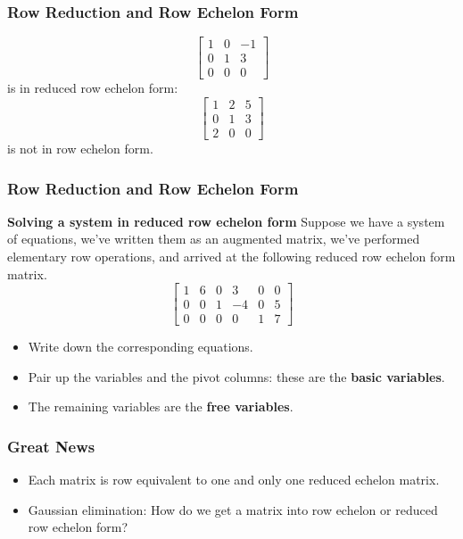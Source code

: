   \begin{frame}[fragile]\frametitle{Row Reduction and Row Echelon Form}
\[
\begin{bmatrix}
 1 & 0 & -1 \\
 0 & 1 & 3 \\
 0 & 0 & 0
\end{bmatrix}
\] 
is in reduced row echelon form:
\[
\begin{bmatrix}
 1 & 2 & 5 \\
 0 & 1 & 3 \\
 2 & 0 & 0
\end{bmatrix}
\] 
is not in row echelon form.
\end{frame}

  \begin{frame}[fragile]\frametitle{Row Reduction and Row Echelon Form}

\textbf{Solving a system in reduced row echelon form}
Suppose we have a system of equations, we've written them as an 
augmented matrix, we've performed elementary row operations, and arrived
at the following reduced row echelon form matrix.  
\[
 \begin{bmatrix}
  1 & 6 & 0 & 3 & 0 & 0 \\
  0 & 0 & 1 & -4 & 0 & 5\\
  0 & 0 & 0 & 0 & 1 & 7 
 \end{bmatrix}
 \]
 
 
\begin{itemize}
 \item  Write down the corresponding equations.
 \item  Pair up the variables and the pivot columns: these are the \textbf{basic variables}.
 \item  The remaining variables are the \textbf{free variables}.
\end{itemize}

\end{frame}

  \begin{frame}[fragile]\frametitle{Great News}

\begin{itemize}
 \item  Each matrix is row equivalent to one and only one reduced echelon matrix.
\item Gaussian elimination: How do we get a matrix into row echelon or reduced row echelon form?
\end{itemize}
\end{frame}

